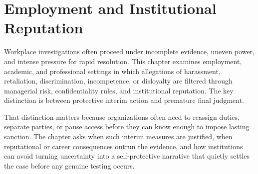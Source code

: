 
\chapter{Employment and Institutional Reputation}
\label{ch:ch088}

Workplace investigations often proceed under incomplete evidence, uneven power, and intense pressure for rapid resolution. This chapter examines employment, academic, and professional settings in which allegations of harassment, retaliation, discrimination, incompetence, or disloyalty are filtered through managerial risk, confidentiality rules, and institutional reputation. The key distinction is between protective interim action and premature final judgment.

That distinction matters because organizations often need to reassign duties, separate parties, or pause access before they can know enough to impose lasting sanction. The chapter asks when such interim measures are justified, when reputational or career consequences outrun the evidence, and how institutions can avoid turning uncertainty into a self-protective narrative that quietly settles the case before any genuine testing occurs.
